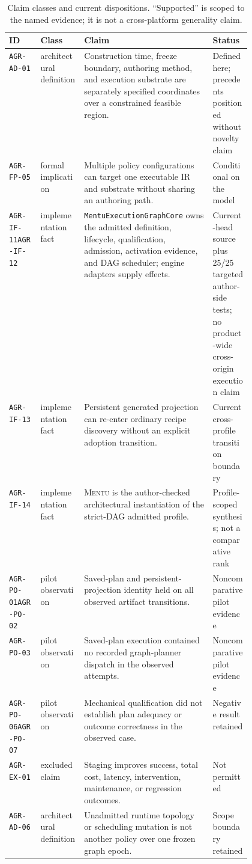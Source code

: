 \documentclass[11pt]{article}
\newcommand{\mentu}{\textsc{Mentu}}
\newcommand{\code}[1]{\texttt{#1}}
\begin{document}
\begin{table}[htbp]
\centering
\small\rmfamily
\begin{tabularx}{\linewidth}{@{}P{0.13\linewidth}P{0.18\linewidth}YP{0.16\linewidth}@{}}
\toprule
ID & Class & Claim & Status \\
\midrule
\code{AGR-AD-01} & architectural definition & Construction time, freeze
boundary, authoring method, and execution substrate are separately specified
coordinates over a constrained feasible region. &
Defined here; precedents positioned without novelty claim \\
\code{AGR-FP-05} & formal implication & Multiple policy configurations can target one
executable IR and substrate without sharing an authoring path. & Conditional on
the model \\
\code{AGR-IF-11}\newline\code{AGR-IF-12} & implementation fact &
\code{MentuExecutionGraphCore} owns the admitted definition, lifecycle,
qualification, admission, activation evidence, and DAG scheduler; engine
adapters supply effects. & Current-head source plus 25/25 targeted author-side
tests; no product-wide cross-origin execution claim \\
\code{AGR-IF-13} & implementation fact & Persistent generated projection can
re-enter ordinary recipe discovery without an explicit adoption transition. &
Current cross-profile transition boundary \\
\code{AGR-IF-14} & implementation fact & \mentu{} is the author-checked
architectural instantiation of the strict-DAG admitted profile. &
Profile-scoped synthesis; not
a comparative rank \\
\code{AGR-PO-01}\newline\code{AGR-PO-02} & pilot observation & Saved-plan and persistent-projection
identity held on all observed artifact transitions. & Noncomparative pilot
evidence \\
\code{AGR-PO-03} & pilot observation & Saved-plan execution contained no
recorded graph-planner dispatch in the observed attempts. & Noncomparative pilot
evidence \\
\code{AGR-PO-06}\newline\code{AGR-PO-07} & pilot observation & Mechanical qualification did not
establish plan adequacy or outcome correctness in the observed case. &
Negative result retained \\
\code{AGR-EX-01} & excluded claim & Staging improves success, total cost,
latency, intervention, maintenance, or regression outcomes. & Not permitted \\
\code{AGR-AD-06} & architectural definition & Unadmitted runtime topology or
scheduling mutation is not another policy over one frozen graph epoch. &
Scope boundary retained \\
\bottomrule
\end{tabularx}
\caption{Claim classes and current dispositions. ``Supported'' is scoped to
the named evidence; it is not a cross-platform generality claim.}
\label{tab:claims}
\end{table}
\end{document}
